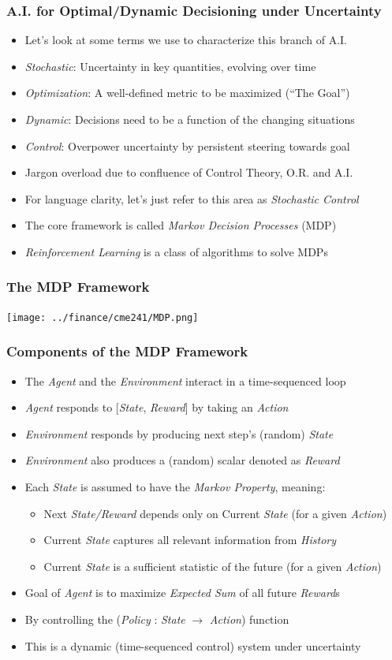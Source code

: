 \documentclass[handout]{beamer}
\begin{document}
\begin{frame}
\frametitle{A.I. for Optimal/Dynamic Decisioning under Uncertainty}
\pause
\begin{itemize}[<+->]
\item Let's look at some terms we use to characterize this branch of A.I.
\item {\em Stochastic}: Uncertainty in key quantities, evolving over time
\item {\em Optimization}: A well-defined metric to be maximized (``The Goal'')
\item {\em Dynamic}:  Decisions need to be a function of the changing situations
\item {\em Control}: Overpower uncertainty by persistent steering towards goal
\item Jargon overload due to confluence of Control Theory, O.R. and A.I.
\item For language clarity, let's just refer to this area as {\em Stochastic Control}
\item The core framework is called {\em Markov Decision Processes} (MDP)
\item {\em Reinforcement Learning} is a class of algorithms to solve MDPs
\end{itemize}
\end{frame}


\begin{frame}
\frametitle{The MDP Framework}
\texttt{[image: ../finance/cme241/MDP.png]}
\end{frame}

\begin{frame}
\frametitle{Components of the MDP Framework}
\pause
\begin{itemize}[<+->]
\item The {\em Agent} and the {\em Environment} interact in a time-sequenced loop
\item {\em Agent} responds to [{\em State}, {\em Reward}] by taking an {\em Action}
\item {\em Environment} responds by producing next step's (random) {\em State}
\item {\em Environment} also produces a (random) scalar denoted as {\em Reward}
\item Each {\em State} is assumed to have the {\em Markov Property}, meaning:
\begin{itemize}
\item Next {\em State/Reward} depends only on Current {\em State} (for a given {\em Action})
\item Current {\em State} captures all relevant information from {\em History}
\item Current {\em State} is a sufficient statistic of the future (for a given {\em Action})
\end{itemize} 
\item Goal of {\em Agent} is to maximize {\em Expected Sum} of all future {\em Reward}s
\item By controlling the ({\em Policy} : {\em State} $\rightarrow$ {\em Action}) function
\item This is a dynamic (time-sequenced control) system under uncertainty
\end{itemize}
\end{frame}
\end{document}
